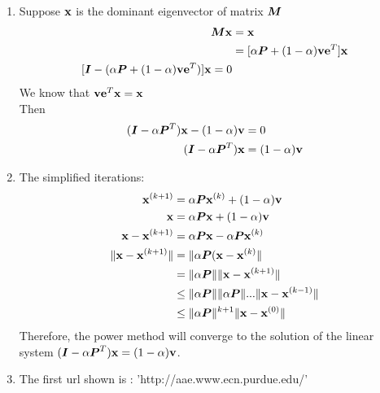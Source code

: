 \documentclass{article}
\begin{document}
\begin{enumerate}
\item 
Suppose $\vx$ is the dominant eigenvector of matrix $\mM$  \\
\begin{align*} 
\mM\vx &= \vx \\
& = [\alpha\mP+(1-\alpha)\vv\ve^T]\vx \\ 
[\mI-(\alpha\mP+(1-\alpha)\vv\ve^T)]\vx=0 \\
\end{align*} 
We know that $\vv\ve^T\vx = \vx$ \\ 
Then \\
\begin{align*} 
(\mI-\alpha\mP^T)\vx-(1-\alpha)\vv & = 0 \\
 (\mI-\alpha\mP^T)\vx &= (1-\alpha)\vv
\end{align*}
\item 
The simplified iterations: \\
\begin{align*} 
\vx^{(k+1)} &= \alpha\mP\vx^{(k)} + (1-\alpha)\vv  \\
\vx  &= \alpha \mP\vx + (1-\alpha)\vv \\ 
\vx-\vx^{(k+1)} & = \alpha\mP\vx-\alpha\mP\vx^{(k)} \\
\|\vx-\vx^{(k+1)}\| &=\|\alpha\mP(\vx-\vx^{(k)}\|  \\
& = \|\alpha\mP\|\|\vx-\vx^{(k+1)} \|  \\
& \leq  \|\alpha\mP\| \|\alpha\mP\|...\|\vx-\vx^{(k-1)} \| \\
& \leq  \|\alpha\mP\|^{k+1}\|\vx-\vx^{(0)}\| \\
\end{align*} 
Therefore, the power method will converge to the solution of the linear system $ (\mI-\alpha\mP^T)\vx = (1-\alpha)\vv$. 

\item 
The first url shown is : 'http://aae.www.ecn.purdue.edu/' \\


\end{enumerate}
\end{document}

